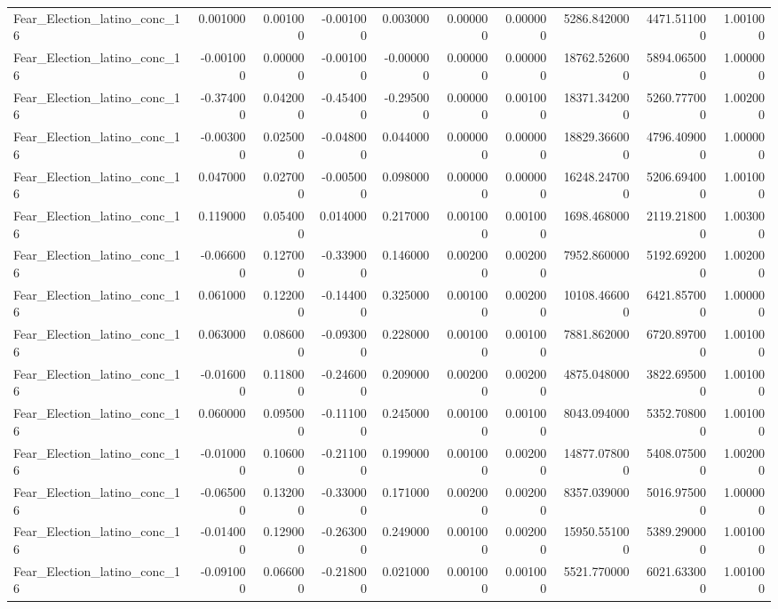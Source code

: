 \begin{table}
\begin{tabular}{lrrrrrrrrr}
Fear_Election_latino_conc_16 & 0.001000 & 0.001000 & -0.001000 & 0.003000 & 0.000000 & 0.000000 & 5286.842000 & 4471.511000 & 1.001000 \\
Fear_Election_latino_conc_16 & -0.001000 & 0.000000 & -0.001000 & -0.000000 & 0.000000 & 0.000000 & 18762.526000 & 5894.065000 & 1.000000 \\
Fear_Election_latino_conc_16 & -0.374000 & 0.042000 & -0.454000 & -0.295000 & 0.000000 & 0.001000 & 18371.342000 & 5260.777000 & 1.002000 \\
Fear_Election_latino_conc_16 & -0.003000 & 0.025000 & -0.048000 & 0.044000 & 0.000000 & 0.000000 & 18829.366000 & 4796.409000 & 1.000000 \\
Fear_Election_latino_conc_16 & 0.047000 & 0.027000 & -0.005000 & 0.098000 & 0.000000 & 0.000000 & 16248.247000 & 5206.694000 & 1.001000 \\
Fear_Election_latino_conc_16 & 0.119000 & 0.054000 & 0.014000 & 0.217000 & 0.001000 & 0.001000 & 1698.468000 & 2119.218000 & 1.003000 \\
Fear_Election_latino_conc_16 & -0.066000 & 0.127000 & -0.339000 & 0.146000 & 0.002000 & 0.002000 & 7952.860000 & 5192.692000 & 1.002000 \\
Fear_Election_latino_conc_16 & 0.061000 & 0.122000 & -0.144000 & 0.325000 & 0.001000 & 0.002000 & 10108.466000 & 6421.857000 & 1.000000 \\
Fear_Election_latino_conc_16 & 0.063000 & 0.086000 & -0.093000 & 0.228000 & 0.001000 & 0.001000 & 7881.862000 & 6720.897000 & 1.001000 \\
Fear_Election_latino_conc_16 & -0.016000 & 0.118000 & -0.246000 & 0.209000 & 0.002000 & 0.002000 & 4875.048000 & 3822.695000 & 1.001000 \\
Fear_Election_latino_conc_16 & 0.060000 & 0.095000 & -0.111000 & 0.245000 & 0.001000 & 0.001000 & 8043.094000 & 5352.708000 & 1.001000 \\
Fear_Election_latino_conc_16 & -0.010000 & 0.106000 & -0.211000 & 0.199000 & 0.001000 & 0.002000 & 14877.078000 & 5408.075000 & 1.002000 \\
Fear_Election_latino_conc_16 & -0.065000 & 0.132000 & -0.330000 & 0.171000 & 0.002000 & 0.002000 & 8357.039000 & 5016.975000 & 1.000000 \\
Fear_Election_latino_conc_16 & -0.014000 & 0.129000 & -0.263000 & 0.249000 & 0.001000 & 0.002000 & 15950.551000 & 5389.290000 & 1.001000 \\
Fear_Election_latino_conc_16 & -0.091000 & 0.066000 & -0.218000 & 0.021000 & 0.001000 & 0.001000 & 5521.770000 & 6021.633000 & 1.001000 \\

\end{tabular}
\end{table}
